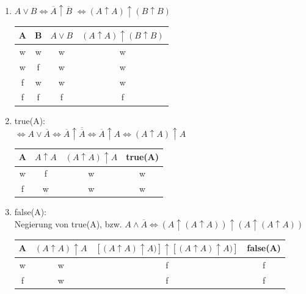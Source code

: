 \documentclass[a4paper,abstract,german]{scrreprt}
\begin{document}
\begin{enumerate}
\begin{enumerate}
    \item
    	$ A \lor B \iff \overline{A} \uparrow \overline{B}$
    	$\iff  (A \uparrow A) \uparrow (B \uparrow B)$
    	\begin{center}
    	\begin{tabular}{||c c | c | c ||}
         A & B & $ A \lor B$ & $(A \uparrow A) \uparrow (B \uparrow B)$ \\
         \hline
         w & w & w & w\\
         w & f & w & w\\
         f & w & w & w\\
         f & f & f & f\\
        \end{tabular}
        \end{center}
        
    \item
    	true(A):\\
    	$\iff A \lor \overline{A} \iff  \overline{A} \uparrow \overline{\overline{A}} \iff  \overline{A} \uparrow A \iff  (A \uparrow A) \uparrow A$
    	\begin{center}
    	\begin{tabular}{||c | c | c | c  ||}
         A & $A \uparrow A$  & $ (A \uparrow A) \uparrow A$ & true(A) \\
         \hline
         w & f & w & w\\
         f & w & w & w\\
        \end{tabular}
        \end{center}
        
    \item
    	false(A):\\
    	Negierung von true(A), bzw.
    	$A \land \overline{A} \iff (A \uparrow (A \uparrow A)) \uparrow(A \uparrow (A \uparrow A))$
    	
    	\begin{center}
    	\begin{tabular}{||c | c | c | c  ||}
         A & $ (A \uparrow A) \uparrow A$ & $[(A \uparrow A) \uparrow A)] \uparrow [(A \uparrow A) \uparrow A)]$ & false(A) \\
         \hline
         w & w & f & f\\
         f & w & f & f\\
        \end{tabular}
        \end{center}

	\end{enumerate}
	

\end{enumerate}
\end{document}
